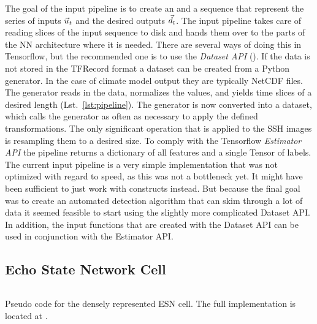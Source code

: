 The goal of the input pipeline is to create an  and a 
sequence that represent the series of inputs $\vec{u}_t$ and the desired outputs
$\vec{d}_t$.  The input pipeline takes care of reading slices of the input
sequence to disk and hands them over to the parts of the NN architecture where
it is needed.  There are several ways of doing this in Tensorflow, but the
recommended one is to use the \emph{Dataset API} ().  If
the data is not stored in the TFRecord format a dataset can be created from a
Python generator.  In the case of climate model output they are typically
NetCDF files.  The generator reads in the data, normalizes the values, and
yields time slices of a desired length (Lst.~\ref{lst:pipeline}).  The
generator is now converted into a dataset, which calls the generator as often
as necessary to apply the defined transformations.  The only significant
operation that is applied to the SSH images is resampling them to a desired
size.  To comply with the Tensorflow \emph{Estimator API} the pipeline returns
a dictionary of all features and a single Tensor of labels.  The current input
pipeline is a very simple implementation that was not optimized with regard
to speed, as this was not a bottleneck yet. It might have been sufficient to
just work with  constructs instead.  But because the final
goal was to create an automated detection algorithm that can skim through a lot
of data it seemed feasible to start using the slightly more complicated Dataset
API. In addition, the input functions that are created with the Dataset API can
be used in conjunction with the Estimator API.


\subsection{Echo State Network Cell}%
\label{sec:echo_state_network_cell}

\begin{listing}
  \inputminted{py}{pseudocode/esn_cell.py}
  \caption{Pseudo code for the densely represented ESN cell. The full
  implementation is located at .}
  \label{lst:esn_cell}
\end{listing}

